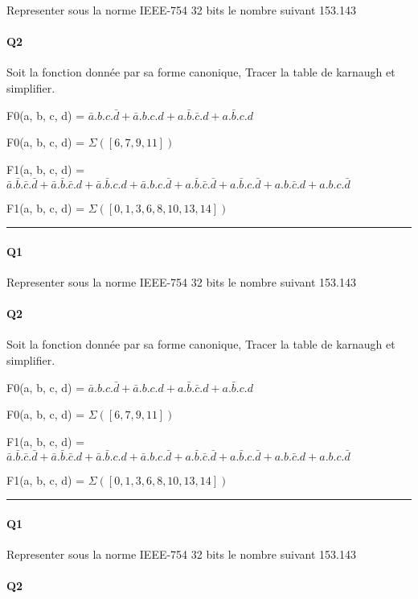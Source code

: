 Representer sous la norme IEEE-754 32 bits le nombre suivant
153.143
\paragraph{Q2}

Soit la fonction donnée par sa forme canonique, Tracer la table de karnaugh et simplifier.

F0(a, b, c, d) = $\bar a.b.c.\bar d + \bar a.b.c.d + a.\bar b.\bar c.d + a.\bar b.c.d$

F0(a, b, c, d) = $\varSigma([6, 7, 9, 11])$

F1(a, b, c, d) = $\bar a.\bar b.\bar c.\bar d + \bar a.\bar b.\bar c.d + \bar a.\bar b.c.d + \bar a.b.c.\bar d + a.\bar b.\bar c.\bar d + a.\bar b.c.\bar d + a.b.\bar c.d + a.b.c.\bar d$

F1(a, b, c, d) = $\varSigma([0, 1, 3, 6, 8, 10, 13, 14])$


\hrule width 1\linewidth
\paragraph{Q1}

Representer sous la norme IEEE-754 32 bits le nombre suivant
153.143
\paragraph{Q2}

Soit la fonction donnée par sa forme canonique, Tracer la table de karnaugh et simplifier.

F0(a, b, c, d) = $\bar a.b.c.\bar d + \bar a.b.c.d + a.\bar b.\bar c.d + a.\bar b.c.d$

F0(a, b, c, d) = $\varSigma([6, 7, 9, 11])$

F1(a, b, c, d) = $\bar a.\bar b.\bar c.\bar d + \bar a.\bar b.\bar c.d + \bar a.\bar b.c.d + \bar a.b.c.\bar d + a.\bar b.\bar c.\bar d + a.\bar b.c.\bar d + a.b.\bar c.d + a.b.c.\bar d$

F1(a, b, c, d) = $\varSigma([0, 1, 3, 6, 8, 10, 13, 14])$


\hrule width 1\linewidth
\paragraph{Q1}

Representer sous la norme IEEE-754 32 bits le nombre suivant
153.143
\paragraph{Q2}

